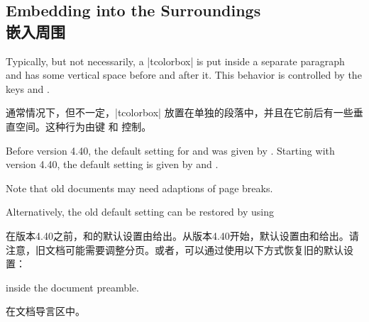 \subsection{Embedding into the Surroundings\\嵌入周围}\label{subsec:surroundings}

Typically, but not necessarily, a |tcolorbox| is put inside a separate paragraph and has some vertical space before and after it.
This behavior is controlled by the keys  and .

通常情况下，但不一定，|tcolorbox| 放置在单独的段落中，并且在它前后有一些垂直空间。这种行为由键  和  控制。


\begin{marker}
Before version 4.40, the default setting for 
and  was given by .
Starting with version 4.40, the default setting is given by
 and .\par
Note that old documents may need adaptions of page breaks.\par
Alternatively, the old default setting can be restored by using


在版本4.40之前，和的默认设置由给出。从版本4.40开始，默认设置由和给出。请注意，旧文档可能需要调整分页。或者，可以通过使用以下方式恢复旧的默认设置：
\begin{dispListing}
\end{dispListing}
inside the document preamble.

在文档导言区中。
\end{marker}

